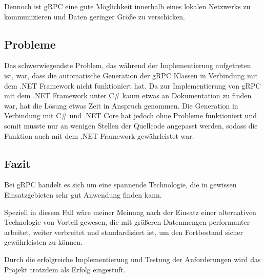 Dennoch ist {\acs{gRPC}} eine gute Möglichkeit innerhalb eines lokalen Netzwerks zu kommunizieren und Daten geringer Größe zu verschicken.

\subsection{Probleme}
\label{sec:Probleme}
Das schwerwiegendste Problem, das während der Implementierung aufgetreten ist, war, dass die automatische Generation der {\acs{gRPC}} Klassen in Verbindung mit dem .NET Framework nicht funktioniert hat. Da zur Implementierung von {\acs{gRPC}} mit dem .NET Framework unter C\# kaum etwas an Dokumentation zu finden war, hat die Lösung etwas Zeit in Anspruch genommen. Die Generation in Verbindung mit C\# und .NET Core hat jedoch ohne Probleme funktioniert und somit musste nur an wenigen Stellen der Quellcode angepasst werden, sodass die Funktion auch mit dem .NET Framework gewährleistet war.

\subsection{Fazit}
\label{sec:Fazit}
Bei {\acs{gRPC}} handelt es sich um eine spannende Technologie, die in gewissen Einsatzgebieten sehr gut Anwendung finden kann.

Speziell in diesem Fall wäre meiner Meinung nach der Einsatz einer alternativen Technologie von Vorteil gewesen, die mit größeren Datenmengen performanter arbeitet, weiter verbreitet und standardisiert ist, um den Fortbestand sicher gewährleisten zu können.

Durch die erfolgreiche Implementierung und Testung der Anforderungen wird das Projekt trotzdem als Erfolg eingestuft.